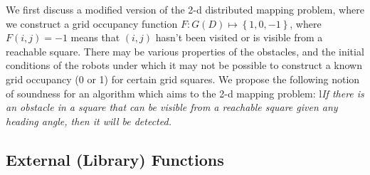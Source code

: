 We first discuss a modified version of the 2-d distributed mapping problem, where we construct a grid occupancy function $F: G(D) \mapsto \left\{1,0,-1\right\}$, where $F(i,j) = -1$ means that $(i,j)$ hasn't been visited or is visible from a reachable square. There may be various properties of the obstacles, and the initial conditions of the robots under which it may not be possible to construct a known grid occupancy (0 or 1) for certain grid squares. We propose the following notion of soundness for an algorithm which aims to the 2-d mapping problem:
l{\em If there is an obstacle in a square that can be visible from a reachable square given any heading angle, then it will be detected. }


\subsection{External (Library) Functions}
